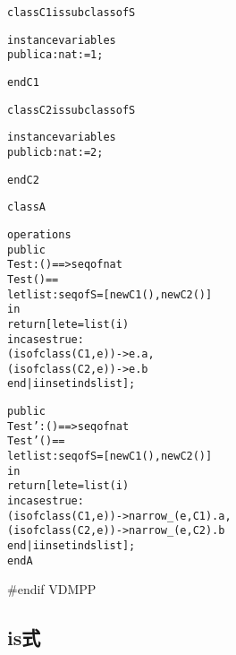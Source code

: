 \documentclass[\pformat,12pt]{jarticle}
\begin{document}
\begin{description}
\begin{alltt}
class C1 is subclass of S

instance variables
public a : nat := 1;

end C1

class C2 is subclass of S

instance variables
public b : nat := 2;

end C2

class A

operations
public
Test: () ==>  seq of nat
Test() ==
 let list : seq of S = [ new C1(), new C2() ]
 in
   return [ let e = list(i)
            in cases true:
                (isofclass(C1, e)) -> e.a,
                (isofclass(C2, e)) -> e.b
               end | i in set inds list ];

public
Test': () ==>  seq of nat
Test'() ==
 let list : seq of S = [ new C1(), new C2() ]
 in
   return [ let e = list(i)
            in cases true:
                (isofclass(C1, e)) -> narrow_(e, C1).a,
                (isofclass(C2, e)) -> narrow_(e, C2).b
               end | i in set inds list ];
end A
\end{alltt}
#endif VDMPP

\end{description}


\subsection{is式}
\end{document}
